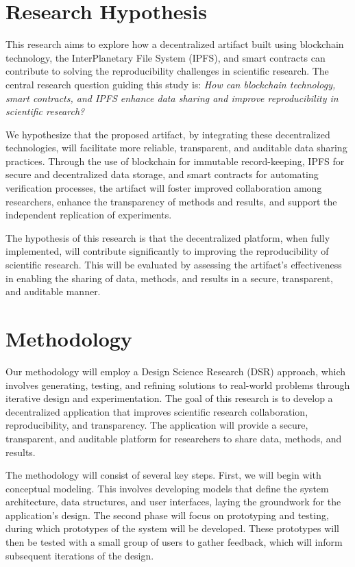 \documentclass{article}
\begin{document}
\section{Research Hypothesis}

This research aims to explore how a decentralized artifact built using blockchain technology, the InterPlanetary File System (IPFS), and smart contracts can contribute to solving the reproducibility challenges in scientific research. The central research question guiding this study is: \textit{How can blockchain technology, smart contracts, and IPFS enhance data sharing and improve reproducibility in scientific research?}

We hypothesize that the proposed artifact, by integrating these decentralized technologies, will facilitate more reliable, transparent, and auditable data sharing practices. Through the use of blockchain for immutable record-keeping, IPFS for secure and decentralized data storage, and smart contracts for automating verification processes, the artifact will foster improved collaboration among researchers, enhance the transparency of methods and results, and support the independent replication of experiments.

The hypothesis of this research is that the decentralized platform, when fully implemented, will contribute significantly to improving the reproducibility of scientific research. This will be evaluated by assessing the artifact’s effectiveness in enabling the sharing of data, methods, and results in a secure, transparent, and auditable manner.

\section{Methodology}

Our methodology will employ a Design Science Research (DSR) approach, which involves generating, testing, and refining solutions to real-world problems through iterative design and experimentation. The goal of this research is to develop a decentralized application that improves scientific research collaboration, reproducibility, and transparency. The application will provide a secure, transparent, and auditable platform for researchers to share data, methods, and results.

The methodology will consist of several key steps. First, we will begin with conceptual modeling. This involves developing models that define the system architecture, data structures, and user interfaces, laying the groundwork for the application’s design. The second phase will focus on prototyping and testing, during which prototypes of the system will be developed. These prototypes will then be tested with a small group of users to gather feedback, which will inform subsequent iterations of the design.
\end{document}
